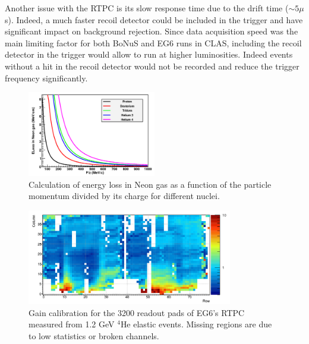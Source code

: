 Another issue with the RTPC is its slow response time due to the drift time ($\sim 5\mu$s). Indeed, a much faster recoil detector could be included in the trigger and have significant impact on background rejection. Since data acquisition speed was the main limiting factor for both BoNuS and EG6 runs in CLAS, including the recoil detector in the trigger would allow to run at higher luminosities. Indeed events without a hit in the recoil detector would not be recorded and reduce the trigger frequency significantly.

\begin{figure}
  \begin{center}
    \includegraphics[angle=0, width=0.5\textwidth]{./../Detector/fig-chap2/pz}
    \caption{Calculation of energy loss in Neon gas as a function of the particle momentum divided by its charge for different nuclei. }
    \label{fig:eloss}
  \end{center}
\end{figure}

\begin{figure}
  \begin{center}
    \includegraphics[angle=0, width=0.8\textwidth]{./../Detector/fig-chap2/eg6_1stPassGains}
    \caption{Gain calibration for the 3200 readout pads of EG6's RTPC measured from 1.2 GeV $^4$He elastic events.  Missing regions are due to low statistics or broken channels.}
    \label{fig:EG6gains}
  \end{center}
\end{figure}

